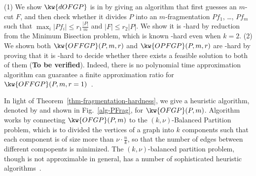\begin{proofS}
(1) We show $\kw{dOFGP}$ is in \NP by giving an \NP algorithm that first guesses an $m$-cut $F$, and then check whether it divides $P$ into an $m$-fragmentation ${Pf}_1$, \ldots, ${Pf}_m$ such that $\max_i |{Pf}_i| \leq r_1\frac{|P|}{m}$ and $|F|\leq r_2|P|$. We show it is \NP-hard by reduction from the {\sc Minimum Bisection} problem, which is known \NP-hard even when $k=2$.
(2) We shown both $\kw{OFFGP}(P, m, r)$ and $\kw{OPFGP}(P, m, r)$ are \NPO-hard by proving that it is \NP-hard to decide whether there exists a feasible solution to both of them ({\bf To be verified}).
Indeed, there is no polynomial time approximation algorithm can guarantee a finite approximation ratio for $\kw{OFFGP}(P,m,r=1)$~\cite{AndreevR06}.
\end{proofS}


In light of Theorem~\ref{thm-fragmentation-hardness}, we give a heuristic algorithm, denoted by  and shown in Fig.~\ref{alg-PFrag}, for $\kw{OFGP}(P,m)$.
Algorithm  works by connecting $\kw{OFGP}(P,m)$ to the {\sc $(k, \nu)$-Balanced Partition} problem, which is to divided the vertices of a graph into $k$ components such that each component is of size more than $\nu\cdot\frac{n}{k}$, so that the number of edges between different compopents is minimized. The $(k,\nu)$-balanced partition problem, though is not approximable in general, has a number of sophisticated heuristic algorithms~\cite{AndreevR06}.

